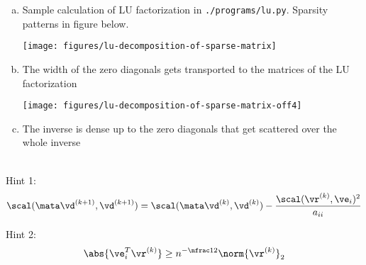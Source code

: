 
\begin{SolutionSheet}[\ref{sheet8}]
\begin{onehalfspace}

  \begin{Solution}
    \begin{enumerate}[(a)]
    \item Sample calculation of LU factorization in
      \lstinline{./programs/lu.py}. Sparsity patterns in figure below.

      \texttt{[image: figures/lu-decomposition-of-sparse-matrix]}
    \item The width of the zero diagonals gets transported to the
       matrices of the LU factorization

      \texttt{[image: figures/lu-decomposition-of-sparse-matrix-off4]}
    \item The inverse is dense up to the zero diagonals that get
      scattered over the whole inverse
    \end{enumerate}

    
  \end{Solution}

  \begin{Solution}
    \hfill\\
    Hint 1:
    \begin{gather*}
      \scal(\mata\vd^{(k+1)},\vd^{(k+1)})
      =\scal(\mata\vd^{(k)},\vd^{(k)})
      -\frac{\scal(\vr^{(k)},\ve_i)^2}{a_{ii}}
    \end{gather*}

    Hint 2:
    \begin{gather*}
      \abs{\ve_i^T \vr^{(k)}} \geq n^{-\nfrac12}\norm{\vr^{(k)}}_2
    \end{gather*}


\end{Solution}
\end{onehalfspace}
\end{SolutionSheet}
